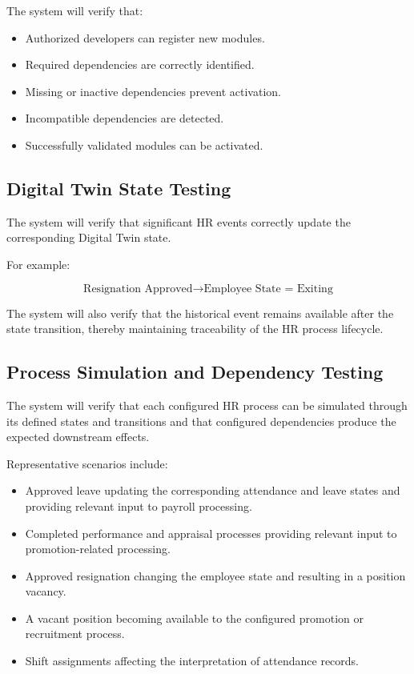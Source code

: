 \documentclass[12pt,a4paper]{article}
\begin{document}
The system will verify that:

\begin{itemize}
    \item Authorized developers can register new modules.
    \item Required dependencies are correctly identified.
    \item Missing or inactive dependencies prevent activation.
    \item Incompatible dependencies are detected.
    \item Successfully validated modules can be activated.
\end{itemize}

\subsection{Digital Twin State Testing}

The system will verify that significant HR events correctly update
the corresponding Digital Twin state.

For example:

\[
\text{Resignation Approved}
\rightarrow
\text{Employee State = Exiting}
\]

The system will also verify that the historical event remains
available after the state transition, thereby maintaining
traceability of the HR process lifecycle.
\subsection{Process Simulation and Dependency Testing}

The system will verify that each configured HR process can be
simulated through its defined states and transitions and that
configured dependencies produce the expected downstream effects.

Representative scenarios include:

\begin{itemize}
    \item Approved leave updating the corresponding attendance and
    leave states and providing relevant input to payroll processing.
    \item Completed performance and appraisal processes providing
    relevant input to promotion-related processing.
    \item Approved resignation changing the employee state and
    resulting in a position vacancy.
    \item A vacant position becoming available to the configured
    promotion or recruitment process.
    \item Shift assignments affecting the interpretation of attendance
    records.
\end{itemize}
\end{document}
